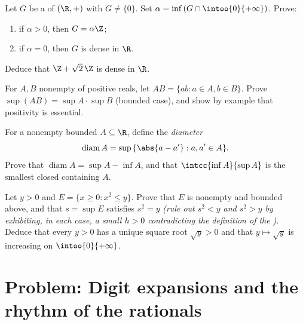 \begin{exercise}[$\star\star\star$]\label{exo:b1:reals:9}
Let $G$ be a  of $(\R, +)$ with $G \neq \{0\}$. Set $\alpha =
\inf\,(G \cap \intoo{0}{+\infty})$. Prove:
\begin{enumerate}
  \item if $\alpha > 0$, then $G = \alpha\Z$;
  \item if $\alpha = 0$, then $G$ is dense in $\R$.
\end{enumerate}
Deduce that $\Z + \sqrt 2\,\Z$ is dense in $\R$.
\end{exercise}

\begin{exercise}[$\star\star\star$]\label{exo:b1:reals:10}
For $A, B$ nonempty  of positive reals, let $AB = \{ab : a \in
A, b \in B\}$. Prove $\sup(AB) = \sup A \cdot \sup B$ (bounded case),
and show by example that positivity is essential.
\end{exercise}

\begin{exercise}[$\star\star$]\label{exo:b1:reals:11}
For a nonempty bounded $A \subseteq \R$, define the
\emph{diameter}
\[
\operatorname{diam} A = \sup\,\{\abs{a - a'} : a, a' \in A\} .
\]
Prove that $\operatorname{diam} A = \sup A - \inf A$, and that
$\intcc{\inf A}{\sup A}$ is the smallest closed 
containing $A$.
\end{exercise}

\begin{exercise}[$\star\star\star$]\label{exo:b1:reals:12}
Let $y > 0$ and $E = \{x \geq 0 : x^2 \leq y\}$. Prove that $E$ is
nonempty and bounded above, and that $s = \sup E$ satisfies $s^2 =
y$ \emph{(rule out $s^2 < y$ and $s^2 > y$ by exhibiting, in each
case, a small $h > 0$ contradicting the definition of the
)}. Deduce that every $y > 0$ has a unique square root
$\sqrt y > 0$ and that $y \mapsto \sqrt y$ is increasing on
$\intoo{0}{+\infty}$.
\end{exercise}

\section{Problem: Digit expansions and the rhythm of the rationals}

